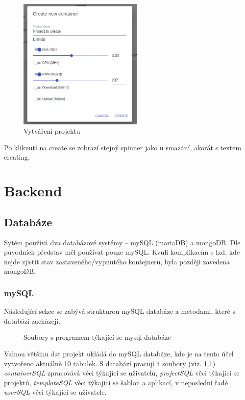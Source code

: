 \documentclass[a4paper,oneside,12pt]{report}
\begin{document}
\begin{figure}[h]
	\centering
	\includegraphics[height=6.5cm]{../img/createPro.png}
	\caption[Vytváření projekt, vlastní tvorba]{Vytváření projektu}
	\label{fig:createPro}
\end{figure}

Po kliknutí na create se zobrazí stejný spinner jako u smazání, akorát s textem creating.


\chapter{Backend}


\section{Databáze}

Sytém používá dva databázové systémy -- mySQL (mariaDB) a mongoDB.
Dle původních představ měl používat pouze mySQL.
Kvůli komplikacím s lxd, kde nejde zjistit stav zastaveného/vypnutého kontejneru, byla později zavedena mongoDB.

\subsection{mySQL}
Následující sekce se zabývá strukturou mySQL databáze a metodami, které s databází zacházejí.


\begin{figure}[h]
	\caption[Soubory s programem týkající se mysql databáze, vlastni tvorba]{Soubory s programem týkající se mysql databáze}
	\label{fig:sqlClasses}
\end{figure}

Valnou většinu dat projekt ukládá do mySQL databáze, kde je na tento účel vytvořeno aktuálně 10 tabulek.
S databází pracují 4 soubory (viz. \ref{fig:sqlClasses}) \textit{containerSQL} zpracovává věci týkající se uživatelů, \textit{projectSQL} věci týkající se projektů, \textit{templateSQL} věci týkající se šablon a aplikací, v neposlední řadě \textit{userSQL} věci týkající se uživatele.
\end{document}
